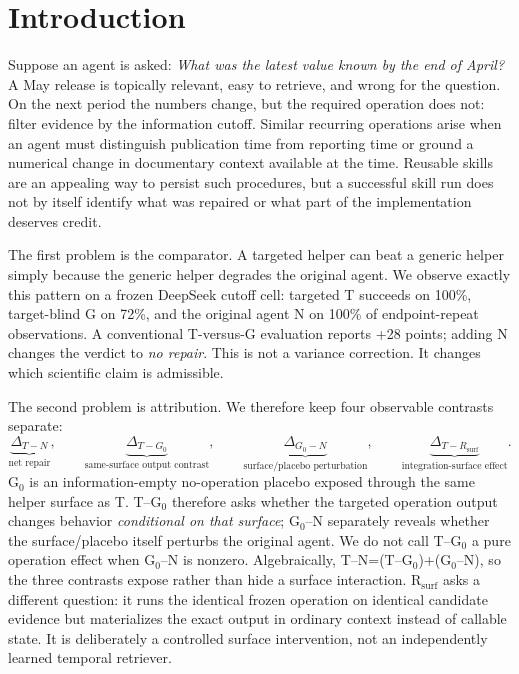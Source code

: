 \section{Introduction}
Suppose an agent is asked: \emph{What was the latest value known by the end of April?} A May release is topically relevant, easy to retrieve, and wrong for the question. On the next period the numbers change, but the required operation does not: filter evidence by the information cutoff. Similar recurring operations arise when an agent must distinguish publication time from reporting time or ground a numerical change in documentary context available at the time. Reusable skills are an appealing way to persist such procedures, but a successful skill run does not by itself identify what was repaired or what part of the implementation deserves credit.

The first problem is the comparator. A targeted helper can beat a generic helper simply because the generic helper degrades the original agent. We observe exactly this pattern on a frozen DeepSeek cutoff cell: targeted T succeeds on 100\%, target-blind G on 72\%, and the original agent N on 100\% of endpoint-repeat observations. A conventional T-versus-G evaluation reports +28 points; adding N changes the verdict to \emph{no repair}. This is not a variance correction. It changes which scientific claim is admissible.

The second problem is attribution. We therefore keep four observable contrasts separate:
\begin{equation}
\underbrace{\Delta_{T-N}}_{\text{net repair}},\qquad
\underbrace{\Delta_{T-G_0}}_{\text{same-surface output contrast}},\qquad
\underbrace{\Delta_{G_0-N}}_{\text{surface/placebo perturbation}},\qquad
\underbrace{\Delta_{T-R_{\mathrm{surf}}}}_{\text{integration-surface effect}}.
\end{equation}
G$_0$ is an information-empty no-operation placebo exposed through the same helper surface as T. T--G$_0$ therefore asks whether the targeted operation output changes behavior \emph{conditional on that surface}; G$_0$--N separately reveals whether the surface/placebo itself perturbs the original agent. We do not call T--G$_0$ a pure operation effect when G$_0$--N is nonzero. Algebraically, T--N=(T--G$_0$)+(G$_0$--N), so the three contrasts expose rather than hide a surface interaction. R$_{\mathrm{surf}}$ asks a different question: it runs the identical frozen operation on identical candidate evidence but materializes the exact output in ordinary context instead of callable state. It is deliberately a controlled surface intervention, not an independently learned temporal retriever.

